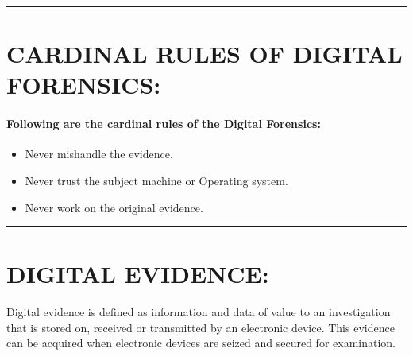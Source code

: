 \documentclass[10pt,british,english]{article}
\begin{document}
\rule[0.5ex]{1\columnwidth}{1pt}

\section{CARDINAL RULES OF DIGITAL FORENSICS:}

\paragraph{Following are the cardinal rules of the Digital Forensics:}
\begin{itemize}
\item Never mishandle the evidence.
\item Never trust the subject machine or Operating system.
\item Never work on the original evidence.
\end{itemize}
\rule[0.5ex]{1\columnwidth}{1pt}

\section{DIGITAL EVIDENCE:}

Digital evidence is defined as information and data of value to an
investigation that is stored on, received or transmitted by an electronic
device. This evidence can be acquired when electronic devices are
seized and secured for examination. 
\end{document}
